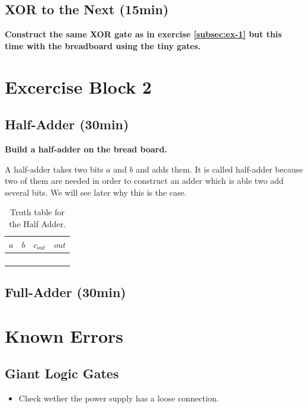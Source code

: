 \documentclass[10pt,a4paper]{article}
\begin{document}
\subsection{XOR to the Next (15min)}
\textbf{Construct the same XOR gate as in exercise \ref{subsec:ex-1} but this time with the breadboard using the tiny gates.}


\section{Excercise Block 2}

\subsection{Half-Adder (30min)}
\textbf{Build a half-adder on the bread board.}

A half-adder takes two bits $a$ and $b$ and adds them. It is called half-adder because two of them are needed in order to construct an adder which is able two add several bits. We will see later why this is the case.
\begin{table}[H]
	\centering
	\begin{tabular}{|c|c||c|c|}
		\hline
		$a$ & $b$ & $c_{out}$ & $out$ \\ \hline
		&     &           &       \\ \hline
		&     &           &       \\ \hline
		&     &           &       \\ \hline
		&     &           &       \\ \hline
	\end{tabular}
	\caption{Truth table for the Half Adder.}
	\label{tab:half-adder-truth-table}
\end{table}

\subsection{Full-Adder (30min)}

\section{Known Errors}
\subsection{Giant Logic Gates}
\begin{itemize}
	\item Check wether the power supply has a loose connection.
\end{itemize}
\end{document}
